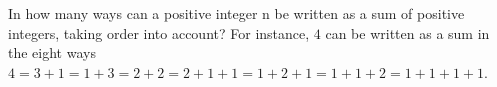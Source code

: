 In how many ways can a positive integer n be written as a sum of positive integers, taking order into account?
For instance, $4$ can be written as a sum in the eight ways $4 = 3 + 1 = 1 + 3 = 2 + 2 = 2 + 1 + 1 = 1 + 2 + 1 = 1 + 1 + 2 = 1 + 1 + 1 + 1$.